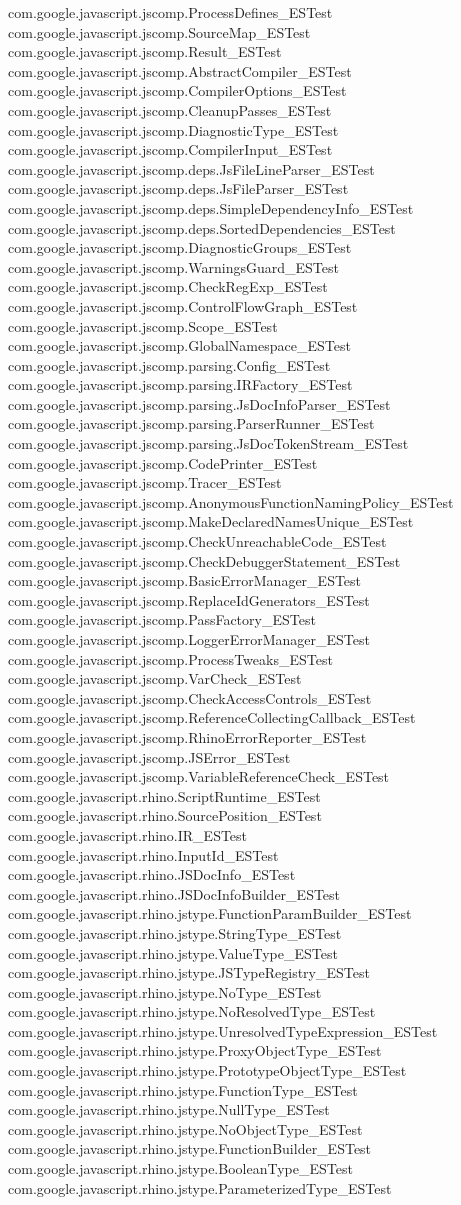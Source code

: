 \documentclass[11pt]{article}
\newenvironment{Shaded}{}{}
\begin{document}
\begin{Shaded}
\begin{Highlighting}[]
com.google.javascript.jscomp.ProcessDefines_ESTest com.google.javascript.jscomp.SourceMap_ESTest com.google.javascript.jscomp.Result_ESTest com.google.javascript.jscomp.AbstractCompiler_ESTest com.google.javascript.jscomp.CompilerOptions_ESTest com.google.javascript.jscomp.CleanupPasses_ESTest com.google.javascript.jscomp.DiagnosticType_ESTest com.google.javascript.jscomp.CompilerInput_ESTest com.google.javascript.jscomp.deps.JsFileLineParser_ESTest com.google.javascript.jscomp.deps.JsFileParser_ESTest com.google.javascript.jscomp.deps.SimpleDependencyInfo_ESTest com.google.javascript.jscomp.deps.SortedDependencies_ESTest com.google.javascript.jscomp.DiagnosticGroups_ESTest com.google.javascript.jscomp.WarningsGuard_ESTest com.google.javascript.jscomp.CheckRegExp_ESTest com.google.javascript.jscomp.ControlFlowGraph_ESTest com.google.javascript.jscomp.Scope_ESTest com.google.javascript.jscomp.GlobalNamespace_ESTest com.google.javascript.jscomp.parsing.Config_ESTest com.google.javascript.jscomp.parsing.IRFactory_ESTest com.google.javascript.jscomp.parsing.JsDocInfoParser_ESTest com.google.javascript.jscomp.parsing.ParserRunner_ESTest com.google.javascript.jscomp.parsing.JsDocTokenStream_ESTest com.google.javascript.jscomp.CodePrinter_ESTest com.google.javascript.jscomp.Tracer_ESTest com.google.javascript.jscomp.AnonymousFunctionNamingPolicy_ESTest com.google.javascript.jscomp.MakeDeclaredNamesUnique_ESTest com.google.javascript.jscomp.CheckUnreachableCode_ESTest com.google.javascript.jscomp.CheckDebuggerStatement_ESTest com.google.javascript.jscomp.BasicErrorManager_ESTest com.google.javascript.jscomp.ReplaceIdGenerators_ESTest com.google.javascript.jscomp.PassFactory_ESTest com.google.javascript.jscomp.LoggerErrorManager_ESTest com.google.javascript.jscomp.ProcessTweaks_ESTest com.google.javascript.jscomp.VarCheck_ESTest com.google.javascript.jscomp.CheckAccessControls_ESTest com.google.javascript.jscomp.ReferenceCollectingCallback_ESTest com.google.javascript.jscomp.RhinoErrorReporter_ESTest com.google.javascript.jscomp.JSError_ESTest com.google.javascript.jscomp.VariableReferenceCheck_ESTest com.google.javascript.rhino.ScriptRuntime_ESTest com.google.javascript.rhino.SourcePosition_ESTest com.google.javascript.rhino.IR_ESTest com.google.javascript.rhino.InputId_ESTest com.google.javascript.rhino.JSDocInfo_ESTest com.google.javascript.rhino.JSDocInfoBuilder_ESTest com.google.javascript.rhino.jstype.FunctionParamBuilder_ESTest com.google.javascript.rhino.jstype.StringType_ESTest com.google.javascript.rhino.jstype.ValueType_ESTest com.google.javascript.rhino.jstype.JSTypeRegistry_ESTest com.google.javascript.rhino.jstype.NoType_ESTest com.google.javascript.rhino.jstype.NoResolvedType_ESTest com.google.javascript.rhino.jstype.UnresolvedTypeExpression_ESTest com.google.javascript.rhino.jstype.ProxyObjectType_ESTest com.google.javascript.rhino.jstype.PrototypeObjectType_ESTest com.google.javascript.rhino.jstype.FunctionType_ESTest com.google.javascript.rhino.jstype.NullType_ESTest com.google.javascript.rhino.jstype.NoObjectType_ESTest com.google.javascript.rhino.jstype.FunctionBuilder_ESTest com.google.javascript.rhino.jstype.BooleanType_ESTest com.google.javascript.rhino.jstype.ParameterizedType_ESTest 
\end{Highlighting}
\end{Shaded}
\end{document}
